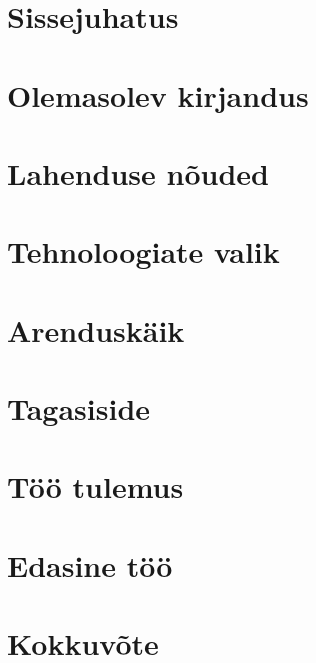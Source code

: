\chapter{Sissejuhatus}


\chapter{Olemasolev kirjandus}


\chapter{Lahenduse nõuded}


\chapter{Tehnoloogiate valik}


\chapter{Arenduskäik}


\chapter{Tagasiside}


\chapter{Töö tulemus}


\chapter{Edasine töö}


\chapter{Kokkuvõte}


